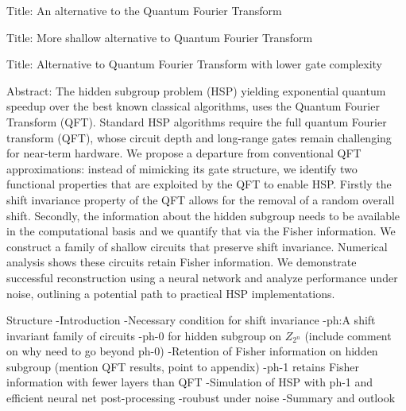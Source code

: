 Title: An alternative to the Quantum Fourier Transform 

Title: More shallow alternative to Quantum Fourier Transform 

Title: Alternative to Quantum Fourier Transform with lower gate complexity

Abstract: The hidden subgroup problem (HSP) yielding exponential quantum speedup over the best known classical algorithms, uses the Quantum Fourier Transform (QFT). Standard HSP algorithms require the full quantum Fourier transform (QFT), whose circuit depth and long-range gates remain challenging for near-term hardware. We propose a departure from conventional QFT approximations: instead of mimicking its gate structure, we identify two functional properties that are exploited by the QFT to enable HSP. Firstly the shift invariance property of the QFT allows for the removal of a random overall shift. Secondly, the information about the hidden subgroup needs to be available in the computational basis and we quantify that via the Fisher information. We construct a family of shallow circuits that preserve shift invariance. Numerical analysis shows these circuits retain Fisher information.  We demonstrate successful reconstruction using a neural network and analyze performance under noise, outlining a potential path to practical HSP implementations.


Structure
-Introduction
-Necessary condition for shift invariance
-ph:A shift invariant family of circuits
-ph-0 for hidden subgroup on $Z_{2^n}$ (include comment on why need to go beyond ph-0)
-Retention of Fisher information on hidden subgroup (mention QFT results, point to appendix)
-ph-1 retains Fisher information with fewer layers than QFT
-Simulation of HSP with ph-1 and efficient neural net post-processing
-roubust under noise
-Summary and outlook





